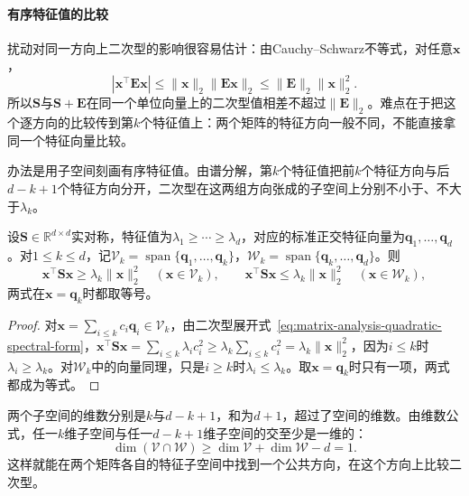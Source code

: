 \paragraph{有序特征值的比较}

扰动对同一方向上二次型的影响很容易估计：由Cauchy--Schwarz不等式，对任意$\bm x$，
\[
 |\bm x^\top\bm E\bm x|\leq\lVert\bm x\rVert_2\lVert\bm E\bm x\rVert_2\leq\lVert\bm E\rVert_2\lVert\bm x\rVert_2^2 .
\]
所以$\bm S$与$\bm S+\bm E$在同一个单位向量上的二次型值相差不超过$\lVert\bm E\rVert_2$。难点在于把这个逐方向的比较传到第$k$个特征值上：两个矩阵的特征方向一般不同，不能直接拿同一个特征向量比较。

办法是用子空间刻画有序特征值。由谱分解，第$k$个特征值把前$k$个特征方向与后$d-k+1$个特征方向分开，二次型在这两组方向张成的子空间上分别不小于、不大于$\lambda_k$。

\begin{lemma}[特征子空间上的二次型界]
\label{lem:ls-eigen-subspace-quadratic-bounds}
\label{lem:ls-restricted-rayleigh}
设$\bm S\in\mathbb R^{d\times d}$实对称，特征值为$\lambda_1\geq\cdots\geq\lambda_d$，对应的标准正交特征向量为$\bm q_1,\ldots,\bm q_d$。对$1\leq k\leq d$，记$\mathcal V_k=\operatorname{span}\{\bm q_1,\ldots,\bm q_k\}$，$\mathcal W_k=\operatorname{span}\{\bm q_k,\ldots,\bm q_d\}$。则
\[
 \bm x^\top\bm S\bm x\geq\lambda_k\lVert\bm x\rVert_2^2\quad(\bm x\in\mathcal V_k),\qquad
 \bm x^\top\bm S\bm x\leq\lambda_k\lVert\bm x\rVert_2^2\quad(\bm x\in\mathcal W_k),
\]
两式在$\bm x=\bm q_k$时都取等号。
\end{lemma}
\begin{proof}
对$\bm x=\sum_{i\leq k}c_i\bm q_i\in\mathcal V_k$，由二次型展开式~\eqref{eq:matrix-analysis-quadratic-spectral-form}，$\bm x^\top\bm S\bm x=\sum_{i\leq k}\lambda_ic_i^2\geq\lambda_k\sum_{i\leq k}c_i^2=\lambda_k\lVert\bm x\rVert_2^2$，因为$i\leq k$时$\lambda_i\geq\lambda_k$。对$\mathcal W_k$中的向量同理，只是$i\geq k$时$\lambda_i\leq\lambda_k$。取$\bm x=\bm q_k$时只有一项，两式都成为等式。
\end{proof}

两个子空间的维数分别是$k$与$d-k+1$，和为$d+1$，超过了空间的维数。由维数公式，任一$k$维子空间与任一$d-k+1$维子空间的交至少是一维的：
\[
 \dim(\mathcal V\cap\mathcal W)\geq\dim\mathcal V+\dim\mathcal W-d=1 .
\]
这样就能在两个矩阵各自的特征子空间中找到一个公共方向，在这个方向上比较二次型。

